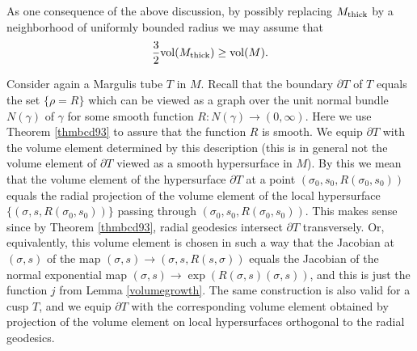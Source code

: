 \documentclass[11pt]{amsart}
\theoremstyle{plain}
\theoremstyle{plain}
\theoremstyle{definition}
\begin{document}
As one consequence of the above discussion, 
by possibly replacing $M_{\rm thick}$ by 
a neighborhood of uniformly bounded radius
we may assume that 
\begin{equation}\label{volume}
\frac{3}{2} {\rm vol}(M_{\rm thick})\geq  {\rm vol}(M).\end{equation}






Consider again a Margulis tube $T$ in $M$.
Recall that the boundary
$\partial T$ of $T$ equals the set $\{\rho=R\}$ which can 
be viewed as a graph over the unit normal bundle $N(\gamma)$ of $\gamma$
for some smooth function $R:N(\gamma)\to (0,\infty)$.
Here we use Theorem \ref{thmbcd93} to assure that the function $R$ is smooth. 
We equip $\partial T$ with the volume element determined by this description
(this is in general not the volume element of $\partial T$ viewed as
a smooth hypersurface in $M$). By this we mean that the volume 
element of the hypersurface $\partial T$ at a point 
$(\sigma_0,s_0,R(\sigma_0,s_0))$ equals the radial 
projection of the volume 
element of the local hypersurface $\{(\sigma,s,R(\sigma_0,s_0))\}$ 
passing through $(\sigma_0,s_0,R(\sigma_0,s_0))$.  
This makes sense since by  Theorem \ref{thmbcd93}, 
radial geodesics intersect $\partial T$ transversely. 
Or, equivalently, 
this volume element is chosen in such a way that the Jacobian at 
$(\sigma,s)$ of the map 
$(\sigma,s)\to (\sigma,s,R(s,\sigma))$  equals
the Jacobian of the normal exponential map $(\sigma,s)\to 
\exp(R(\sigma,s)(\sigma,s))$, and this is just the function $j$ 
from Lemma \ref{volumegrowth}. 
The same construction is also valid for a cusp $T$, 
and we equip $\partial T$ with the corresponding volume element
obtained by projection of the volume element on local 
hypersurfaces orthogonal to the radial geodesics. 
 
\end{document}
